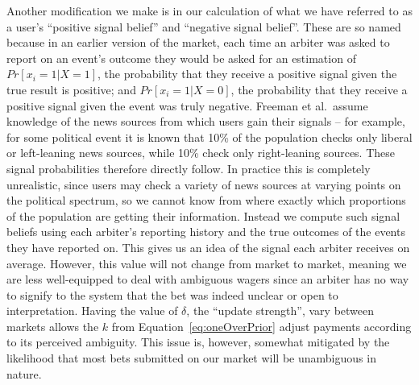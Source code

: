Another modification we make is in our calculation of what we have referred to
as a user's ``positive signal belief'' and ``negative signal belief''. These
are so named because in an earlier version of the market, each time an arbiter
was asked to report on an event's outcome they would be asked for an estimation
of $Pr[x_i=1|X=1]$, the probability that they receive a positive signal given
the true result is positive; and $Pr[x_i=1|X=0]$, the probability that they
receive a positive signal given the event was truly negative. Freeman et al.\
assume knowledge of the news sources from which users gain their signals -- for
example, for some political event it is known that 10\% of the population
checks only liberal or left-leaning news sources, while 10\% check only
right-leaning sources. These signal probabilities therefore directly follow. In
practice this is completely unrealistic, since users may check a variety of
news sources at varying points on the political spectrum, so we cannot know
from where exactly which proportions of the population are getting their
information. Instead we compute such signal beliefs using each arbiter's
reporting history and the true outcomes of the events they have reported on.
This gives us an idea of the signal each arbiter receives on average. However,
this value will not change from market to market, meaning we are less
well-equipped to deal with ambiguous wagers since an arbiter has no way to
signify to the system that the bet was indeed unclear or open to
interpretation. Having the value of $\delta$, the ``update strength'', vary
between markets allows the $k$ from Equation~\ref{eq:oneOverPrior} adjust
payments according to its perceived ambiguity. This issue is, however, somewhat
mitigated by the likelihood that most bets submitted on our market will be
unambiguous in nature.

